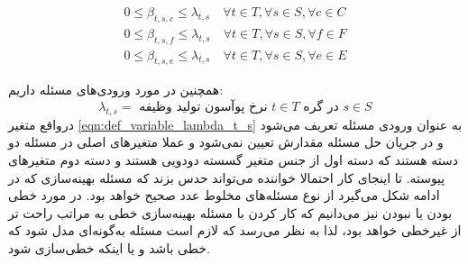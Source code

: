 	\begin{subequations}\label{eqn:def_variable_beta}
		\begin{align}
		0 \le \beta_{t,s,c} \le \lambda_{t,s}  \quad \forall{t \in T}, \forall{s \in S}, \forall{c \in C} \\
		0 \le \beta_{t,s,f} \le \lambda_{t,s}  \quad \forall{t \in T}, \forall{s \in S}, \forall{f \in F} \\
		0 \le \beta_{t,s,e} \le \lambda_{t,s}  \quad \forall{t \in T}, \forall{s \in S}, \forall{e \in E}
		\end{align}
	\end{subequations}
 
		همچنین در مورد ورودی‌های مسئله داریم:
	\begin{equation}\label{eqn:def_variable_lambda_t_s}
	\lambda_{t,s} = \text{ نرخ پوآسون تولید وظیفه $t \in T$ در گره $s \in S$}
	\end{equation}
	درواقع متغیر \cref{eqn:def_variable_lambda_t_s} به عنوان ورودی مسئله تعریف می‌شود و در جریان حل مسئله مقدارش تعیین نمی‌شود و عملا متغیرهای اصلی در مسئله دو دسته هستند که دسته اول از جنس متغیر گسسته دودویی هستند و دسته دوم متغیرهای پیوسته. تا اینجای کار احتمالا خواننده می‌تواند حدس بزند که مسئله بهینه‌سازی که در ادامه شکل می‌گیرد از نوع مسئله‌های مخلوط عدد صحیح  خواهد بود. در مورد خطی بودن یا نبودن نیز می‌دانیم که کار کردن با مسئله بهینه‌سازی خطی به مراتب راحت تر از غیرخطی خواهد بود، لذا به نظر می‌رسد که لازم است مسئله به‌گونه‌ای مدل شود که خطی باشد و یا اینکه خطی‌سازی شود. 
	

